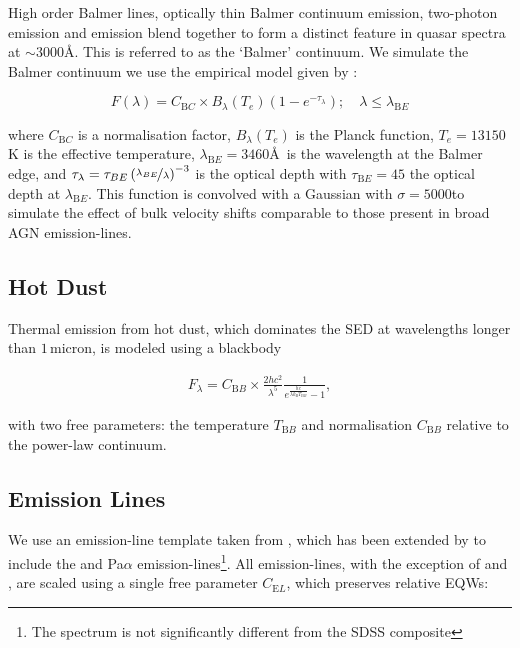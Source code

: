 High order Balmer lines, optically thin Balmer continuum emission, two-photon emission and  emission blend together to form a distinct feature in quasar spectra at $\sim3000$\AA.
This is referred to as the `Balmer' continuum. 
We simulate the Balmer continuum we use the empirical model given by \citet{grandi82}: 

\begin{equation}
  F(\lambda) = C_{\mathrm BC} \times B_\lambda(T_e)(1-e^{-\tau_\lambda}); \quad \lambda \leq \lambda_{\mathrm BE}
\end{equation}

where $C_{\mathrm BC}$ is a normalisation factor, $B_\lambda(T_e)$ is the Planck function, $T_e=13150$K is the effective temperature, $\lambda_{\mathrm BE}=3460$\AA\, is the wavelength at the Balmer edge, and $\tau_\lambda = \tau_{BE}\left( \nicefrac{\lambda_{BE}} {\lambda} \right)^{-3}$ is the optical depth with $\tau_{\mathrm BE}=45$ the optical depth at $\lambda_{\mathrm BE}$. 
This function is convolved with a Gaussian with $\sigma=5000$\kms to simulate the effect of bulk velocity shifts comparable to those present in broad AGN emission-lines. 

\subsection{Hot Dust}

Thermal emission from hot dust, which dominates the SED at wavelengths longer than $1$\,micron, is modeled using a blackbody

\begin{eqnarray}  
  F_\lambda = C_{\mathrm BB} \times \frac{2 hc^2}{\lambda^5}\frac{1}{ e^{\frac{hc}{\lambda k_\mathrm{B}T_{\mathrm BB}}} - 1}, 
\end{eqnarray}

with two free parameters: the temperature $T_{\mathrm BB}$ and normalisation $C_{\mathrm BB}$ relative to the power-law continuum. 

\subsection{Emission Lines}

We use an emission-line template taken from \citet{francis91}, which has been extended by \citet{maddox06} to include the \ha and Pa$\alpha$ emission-lines\footnote{The spectrum is not significantly different from the \citet{vandenberk01} SDSS composite}. 
All emission-lines, with the exception of \ha and \hb, are scaled using a single free parameter $C_{\mathrm EL}$, which preserves relative EQWs:

